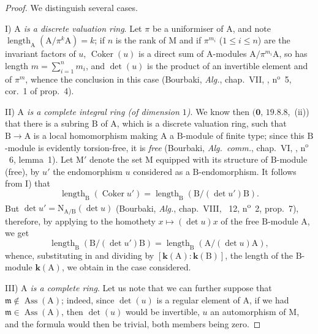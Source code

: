 \begin{proof}
We distinguish several cases.

I) \emph{$\mathrm{A}$ is a discrete valuation ring}.
Let $\pi$ be a uniformiser of $\mathrm{A}$, and note $\operatorname{length}_{\mathrm{A}}(\mathrm{A}/\pi^k\mathrm{A})=k$; if $n$ is the rank of $\mathrm{M}$ and if $\pi^{m_i}$ ($1\leq i\leq n$) are the invariant factors of $u$, $\operatorname{Coker}(u)$ is a direct sum of A-modules $\mathrm{A}/\pi^{m_i}\mathrm{A}$, so has length $m=\sum_{i=1}^n m_i$, and $\det(u)$ is the product of an invertible element and of $\pi^m$, whence the conclusion in this case (Bourbaki, \emph{Alg.}, chap.~VII, , n$^{\mathrm{o}}$~5, cor.~1 of prop.~4).

II) \emph{$\mathrm{A}$ is a complete integral ring (of dimension $1$)}.
We know then $(\mathbf{0}$, $19.8.8$,~(ii)) that there is a subring $\mathrm{B}$ of $\mathrm{A}$, which is a discrete valuation ring, such that $\mathrm{B}\to\mathrm{A}$ is a local homomorphism making $\mathrm{A}$ a $\mathrm{B}$-module of finite type; since this $\mathrm{B}$-module is evidently torsion-free, it is \emph{free} (Bourbaki, \emph{Alg.\ comm.}, chap.~VI, , n$^{\mathrm{o}}$~6, lemma~1).
Let $\mathrm{M}'$ denote the set $\mathrm{M}$ equipped with its structure of $\mathrm{B}$-module (free), by $u'$ the endomorphism $u$ considered as a $\mathrm{B}$-endomorphism.
It follows from I) that
\[
\label{IV.21.10.17.5}
  \operatorname{length}_{\mathrm{B}}(\operatorname{Coker} u')=\operatorname{length}_{\mathrm{B}}(\mathrm{B}/(\det u')\mathrm{B}).
  \tag{21.10.17.5}
\]
But $\det u'=\mathrm{N}_{\mathrm{A}/\mathrm{B}}(\det u)$ (Bourbaki, \emph{Alg.}, chap.~VIII, \textsection~12, n\textsuperscript{o}~2, prop.~7), therefore, by applying  to the homothety $x\mapsto(\det u)x$ of the free $\mathrm{B}$-module $\mathrm{A}$, we get
\[
  \operatorname{length}_{\mathrm{B}}(\mathrm{B}/(\det u')\mathrm{B})=\operatorname{length}_{\mathrm{B}}(\mathrm{A}/(\det u)\mathrm{A}),
\]
whence, substituting in  and dividing by $[\boldsymbol{k}(\mathrm{A}):\boldsymbol{k}(\mathrm{B})]$, the length of the $\mathrm{B}$-module $\boldsymbol{k}(\mathrm{A})$, we obtain  in the case considered.

III) \emph{$\mathrm{A}$ is a complete ring}.
Let us note that we can further suppose that $\mathfrak{m}\notin\operatorname{Ass}(\mathrm{A})$; indeed, since $\det(u)$ is a regular element of $\mathrm{A}$, if we had $\mathfrak{m}\in\operatorname{Ass}(\mathrm{A})$, then $\det(u)$ would be invertible, $u$ an automorphism of $\mathrm{M}$, and the formula  would then be trivial, both members being zero.


\end{proof}
